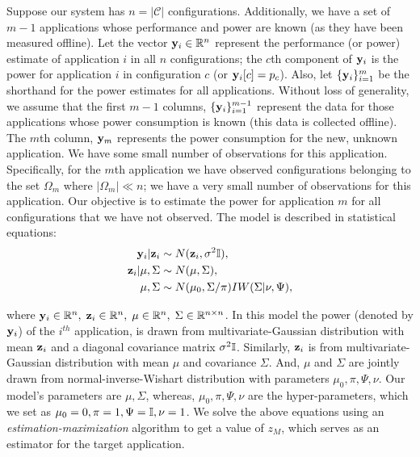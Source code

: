 Suppose our system has $n = |\mathcal{C}|$ configurations.    Additionally, we have a set of $m-1$
applications whose performance and power are known (as they have been
measured offline). Let the vector $\mathbf{y}_i \in \mathbb{R}^{n}$ represent the
performance (or power) estimate of application $i$ in all $n$
configurations; \ie the $c$th component of $\mathbf{y}_i$ is the power for
application $i$ in configuration $c$ (or $\mathbf{y}_i[c] = p_c$).  Also, let
$\{\mathbf{y}_i\}_{i =1}^m$ be the shorthand for the power estimates for all
applications.  Without loss of generality, we assume that the first
$m-1$ columns, \ie $\{\mathbf{y}_i\}_{i =1}^{m-1}$ represent the data for
those applications whose power consumption is known (this data is
collected offline).  The $m$th column, $\mathbf{y}_m$ represents the power
consumption for the new, unknown application.  We have some small
number of observations for this application.  Specifically, for the
$m$th application we have observed configurations belonging to the set
$\Omega_m$ where $|\Omega_m| \ll n$; \ie we have a very small number
of observations for this application.  Our objective is to estimate
the power for application $m$ for all configurations that we have not
observed.  The model is described in statistical equations:
\begin{equation}
\begin{aligned}
\mathbf{y}_i \vert \mathbf{z}_i  &\sim N( \mathbf{z}_i, \sigma^2 \mathbb{I}),\\
\mathbf{z}_i \vert \mu,\Sigma &\sim N(\mu, \Sigma),\\
\mu, \Sigma &\sim N(\mu_0,\Sigma / \pi)IW(\Sigma | \nu, \Psi),
\end{aligned}
\label{eq:HBN}
\end{equation}

where $\mathbf{y}_i \in \mathbb{R}^n, \; \mathbf{z}_i \in \mathbb{R}^n, \; \mu \in \mathbb{R}^{n}, \; \Sigma
\in \mathbb{R}^{n\times n}$. In this model the power (denoted by $\mathbf{y}_i$) of
the $i^{th}$ application, is drawn from multivariate-Gaussian
distribution with mean $\mathbf{z}_i$ and a diagonal covariance matrix
$\sigma^2\mathbb{I}$.  Similarly, $\mathbf{z}_i$ is from multivariate-Gaussian
distribution with mean $\mu$ and covariance $\Sigma$. And, $\mu$ and
$\Sigma$ are jointly drawn from normal-inverse-Wishart distribution
with parameters $\mu_0, \pi,\Psi, \nu$.  Our model's parameters are
$\mu,\Sigma$, whereas, $\mu_0, \pi,\Psi, \nu$ are the
hyper-parameters, which we set as $\mu_0 = 0, \pi = 1,\Psi = \mathbb{I}, \nu =
1$.  We solve the above equations using an
\emph{estimation-maximization} algorithm to get a value of $z_M$,
which serves as an estimator for the target application.



